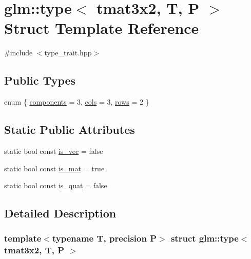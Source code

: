 \hypertarget{structglm_1_1type_3_01tmat3x2_00_01_t_00_01_p_01_4}{}\section{glm\+::type$<$ tmat3x2, T, P $>$ Struct Template Reference}
\label{structglm_1_1type_3_01tmat3x2_00_01_t_00_01_p_01_4}


{\ttfamily \#include $<$type\+\_\+trait.\+hpp$>$}

\subsection*{Public Types}
\begin{DoxyCompactItemize}
\item 
enum \{ \mbox{\hyperlink{structglm_1_1type_3_01tmat3x2_00_01_t_00_01_p_01_4_a2839fb50bc95732158e80e6567b6983ca147005fbb0672d8474c97b2784b9fcea}{components}} = 3, 
\mbox{\hyperlink{structglm_1_1type_3_01tmat3x2_00_01_t_00_01_p_01_4_a2839fb50bc95732158e80e6567b6983ca342493b951e582fb521748c246c07b1a}{cols}} = 3, 
\mbox{\hyperlink{structglm_1_1type_3_01tmat3x2_00_01_t_00_01_p_01_4_a2839fb50bc95732158e80e6567b6983ca820de554ed2285e65944566afefaddef}{rows}} = 2
 \}
\end{DoxyCompactItemize}
\subsection*{Static Public Attributes}
\begin{DoxyCompactItemize}
\item 
static bool const \mbox{\hyperlink{structglm_1_1type_3_01tmat3x2_00_01_t_00_01_p_01_4_a80207f1c8bb7ba278e7d2f18e2b2f8ce}{is\+\_\+vec}} = false
\item 
static bool const \mbox{\hyperlink{structglm_1_1type_3_01tmat3x2_00_01_t_00_01_p_01_4_afe7ea7f17ffcf508e5100ab954d98c92}{is\+\_\+mat}} = true
\item 
static bool const \mbox{\hyperlink{structglm_1_1type_3_01tmat3x2_00_01_t_00_01_p_01_4_abbfc4e2ff155ef38687a479441705e6f}{is\+\_\+quat}} = false
\end{DoxyCompactItemize}


\subsection{Detailed Description}
\subsubsection*{template$<$typename T, precision P$>$\newline
struct glm\+::type$<$ tmat3x2, T, P $>$}



